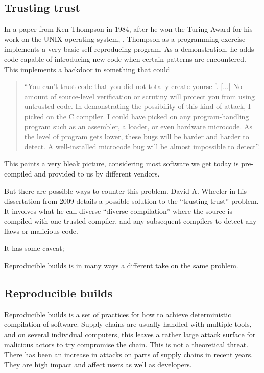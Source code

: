 \documentclass[../Main/thesis.tex]{subfiles}
\begin{document}
\subsection*{Trusting trust}
In a paper from Ken Thompson in 1984, after he won the Turing Award for his work
on the UNIX operating system, , Thompson as a
programming exercise implements a very basic self-reproducing program. As a
demonstration, he adds code capable of introducing new code when certain
patterns are encountered. This implements a backdoor in something that could

\begin{quotation}
``You can't trust code that you did not totally create yourself. [...] No amount
of source-level verification or scrutiny will protect you from using untrusted
code. In demonstrating the possibility of this kind of attack, I picked on the C
compiler. I could have picked on any program-handling program such as an
assembler, a loader, or even hardware microcode. As the level of program gets
lower, these bugs will be harder and harder to detect.  A well-installed
microcode bug will be almost impossible to detect''\cite{ken-thompson-1984}.
\end{quotation}

This paints a very bleak picture, considering most software we get today is
pre-compiled and provided to us by different vendors.


But there are possible ways to counter this problem.  David A. Wheeler in his
dissertation  from 2009 details a possible
solution to the ``trusting trust''-problem. It involves what he call diverse
``diverse compilation'' where the source is compiled with one trusted compiler,
and any subsequent compilers to detect any flaws or malicious code.

It has some caveat; 


Reproducible builds is in many ways a different take on the same problem.

\subsection*{Reproducible builds}
Reproducible builds is a set of practices for how to achieve deterministic
compilation of software. Supply chains are usually handled with multiple tools,
and on several individual computers, this leaves a rather large attack surface
for malicious actors to try compromise the chain. This is not a theoretical
threat. There has been an increase in attacks on parts of supply chains in
recent years. They are high impact and affect users as well as developers.
\end{document}
